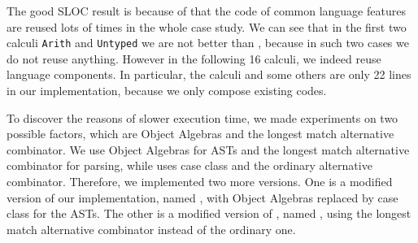 The good SLOC result is because of that the code of common language features
are reused lots of times in the whole case study. We can see that in the first two calculi
\lstinline{Arith} and \lstinline{Untyped} we are not better than \ilyaimpl{},
because in such two cases we do not reuse anything.
However in the following 16 calculi, we indeed reuse language components.
In particular, the calculi  and some others are only 22 lines
in our implementation, because we only compose existing codes.

To discover the reasons of slower execution time, we made experiments
on two possible factors, which are Object Algebras and the longest match alternative combinator.
We use Object Algebras for ASTs and the longest match alternative combinator \inlinecode{|||} for parsing,
while \ilyaimpl{} uses case class and the ordinary alternative combinator.
Therefore, we implemented two more versions. One is a modified version of our implementation,
named \ourclass{}, with Object Algebras replaced by case class for the ASTs.
The other is a modified version of \ilyaimpl{}, named \ilyalongest{},
using the longest match alternative combinator instead of the ordinary one.

